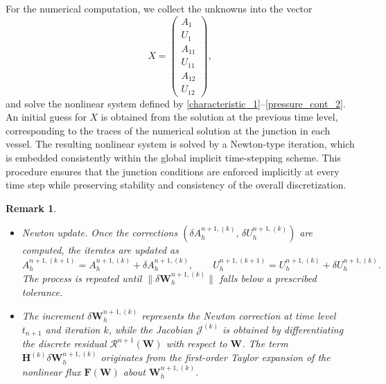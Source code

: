 \documentclass[11pt]{article}
\newtheorem{remark}[theorem]{Remark}
\begin{document}
For the numerical computation, we collect the unknowns into the vector
\[
X =
\begin{pmatrix}
A_1 \\[2pt]
U_1 \\[2pt]
A_{11} \\[2pt]
U_{11} \\[2pt]
A_{12} \\[2pt]
U_{12}
\end{pmatrix},
\]
and solve the nonlinear system defined by \eqref{characteristic_1}--\eqref{pressure_cont_2}. An initial guess for $X$ is obtained from the solution at the previous time level, corresponding to the traces of the numerical solution at the junction in each vessel. The resulting nonlinear system is solved by a Newton-type iteration, which is embedded consistently within the global implicit time-stepping scheme. This procedure ensures that the junction conditions are enforced implicitly at every time step while preserving stability and consistency of the overall discretization.



\begin{remark}
\begin{itemize}
    \item {Newton update.}
Once the corrections $(\delta A_h^{n+1,(k)},\,\delta U_h^{n+1,(k)})$ are computed,
the iterates are updated as
\[
  A_h^{n+1,(k+1)} = A_h^{n+1,(k)} + \delta A_h^{n+1,(k)}, 
  \qquad
  U_h^{n+1,(k+1)} = U_h^{n+1,(k)} + \delta U_h^{n+1,(k)}.
\]
The process is repeated until 
$\|\delta\mathbf{W}_h^{n+1,(k)}\|$ falls below a prescribed tolerance.
\item The increment $\delta\mathbf{W}_h^{n+1,(k)}$ represents the Newton correction at
time level $t_{n+1}$ and iteration $k$, while the Jacobian
$\mathcal{J}^{(k)}$ is obtained by differentiating the discrete residual
$\mathcal{R}^{n+1}(\mathbf{W})$ with respect to $\mathbf{W}$.
The term $\mathbf{H}^{(k)}\delta\mathbf{W}_h^{n+1,(k)}$ originates from the
first-order Taylor expansion of the nonlinear flux
$\mathbf{F}(\mathbf{W})$ about $\mathbf{W}_h^{n+1,(k)}$.
\end{itemize}
\end{remark}
\end{document}
